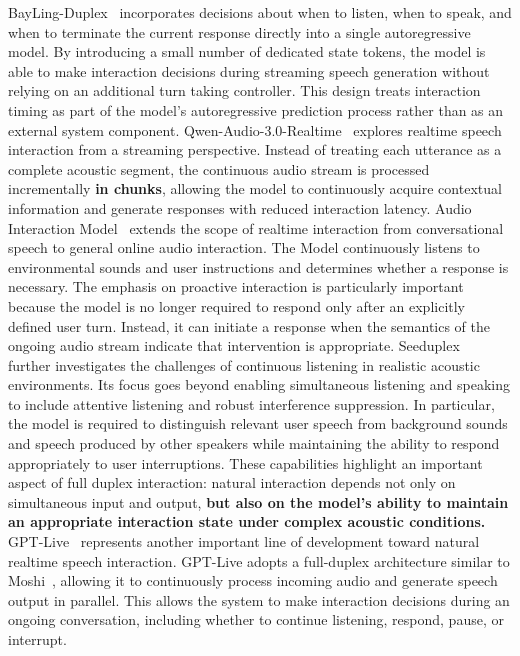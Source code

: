 BayLing-Duplex~\cite{BayLing-Duplex} incorporates decisions about when to listen, when to speak, and when to terminate the current response directly into a single autoregressive model. By introducing a small number of dedicated state tokens, the model is able to make interaction decisions during streaming speech generation without relying on an additional turn taking controller. This design treats interaction timing as part of the model's autoregressive prediction process rather than as an external system component. Qwen-Audio-3.0-Realtime~\cite{qwen_audio_realtime_2026} explores realtime speech interaction from a streaming perspective. Instead of treating each utterance as a complete acoustic segment, the continuous audio stream is processed incrementally \textbf{in chunks}, allowing the model to continuously acquire contextual information and generate responses with reduced interaction latency. Audio Interaction Model~\cite{AudioInteractionModel} extends the scope of realtime interaction from conversational speech to general online audio interaction. The Model continuously listens to environmental sounds and user instructions and determines whether a response is necessary. The emphasis on proactive interaction is particularly important because the model is no longer required to respond only after an explicitly defined user turn. Instead, it can initiate a response when the semantics of the ongoing audio stream indicate that intervention is appropriate. Seeduplex~\cite{seeduplex2026} further investigates the challenges of continuous listening in realistic acoustic environments. Its focus goes beyond enabling simultaneous listening and speaking to include attentive listening and robust interference suppression. In particular, the model is required to distinguish relevant user speech from background sounds and speech produced by other speakers while maintaining the ability to respond appropriately to user interruptions. These capabilities highlight an important aspect of full duplex interaction: natural interaction depends not only on simultaneous input and output, \textbf{but also on the model's ability to maintain an appropriate interaction state under complex acoustic conditions.} GPT-Live~\cite{openai_gpt_live_system_card_2026} represents another important line of development toward natural realtime speech interaction. GPT-Live adopts a full-duplex architecture similar to Moshi~\cite{defossez2024moshi}, allowing it to continuously process incoming audio and generate speech output in parallel. This allows the system to make interaction decisions during an ongoing conversation, including whether to continue listening, respond, pause, or interrupt. 

